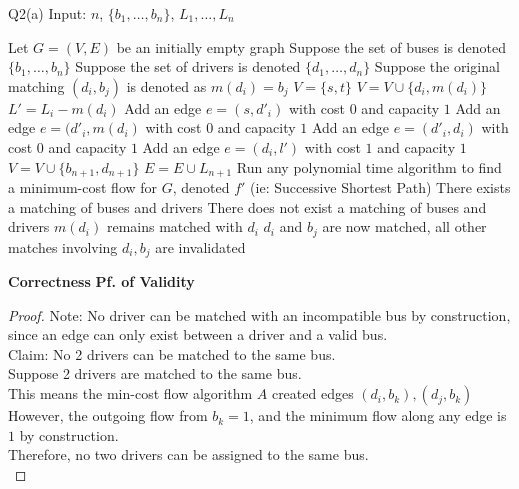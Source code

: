 \begin{problem}
    {Q2(a)}
Input: $n$, $\{b_1, \dots, b_n\}$, $L_1, \dots, L_n$
    \begin{algorithmic}[1]
        \STATE Let $G = (V, E)$ be an initially empty graph
        \STATE Suppose the set of buses is denoted $\{b_1, \dots, b_n\}$
        \STATE Suppose the set of drivers is denoted $\{d_1, \dots, d_n\}$
        \STATE Suppose the original matching $(d_i, b_j)$ is denoted as $m(d_i) = b_j$
        \STATE $V = \{s, t\}$
            \STATE $V = V \cup \{d_i, m(d_i)\}$
            \STATE $L' = L_i - m(d_i)$
            \STATE Add an edge $e = (s, d'_i)$ with cost $0$ and capacity $1$
            \STATE Add an edge $e = (d'_i, m(d_i)$ with cost $0$ and capacity $1$
            \STATE Add an edge $e = (d'_i, d_i)$ with cost $0$ and capacity $1$
                \STATE Add an edge $e = (d_i, l')$ with cost $1$ and capacity $1$
            \ENDFOR
        \ENDFOR
        \STATE $V = V \cup \{b_{n+1}, d_{n+1}\}$
        \STATE $E = E \cup L_{n+1}$
        \STATE Run any polynomial time algorithm to find a minimum-cost flow for $G$, denoted $f'$ (ie: Successive Shortest Path)
        \STATE There exists a matching of buses and drivers
        \ELSE
        \STATE There does not exist a matching of buses and drivers
        \ENDIF
        \STATE $m(d_i)$ remains matched with $d_i$
        \STATE $d_i$ and $b_j$ are now matched, all other matches involving $d_i, b_j$ are invalidated
        \ENDIF
    \end{algorithmic}
    \noindent
    \textbf{Correctness}
    \textbf{Pf. of Validity}
    \begin{proof}
        Note: No driver can be matched with an incompatible bus by construction, since an edge can only exist between a driver and a valid bus. \\
        Claim: No 2 drivers can be matched to the same bus. \\
        Suppose 2 drivers are matched to the same bus. \\
        This means the min-cost flow algorithm $A$ created edges $(d_i, b_k), (d_j, b_k)$ \\
        However, the outgoing flow from $b_k = 1$, and the minimum flow along any edge is $1$ by construction. \\
        Therefore, no two drivers can be assigned to the same bus. \\

\end{proof}
\end{problem}
